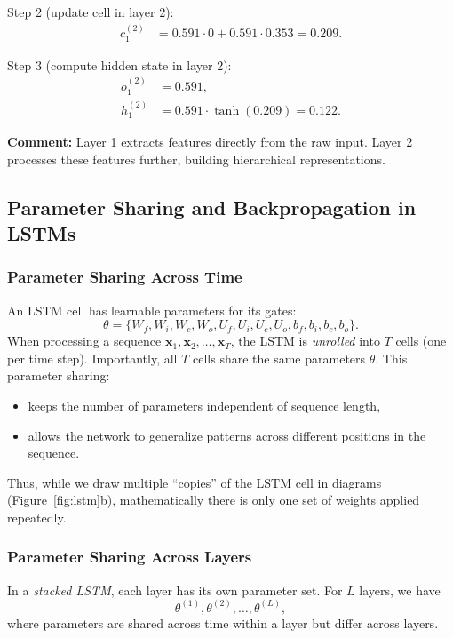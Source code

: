 \documentclass[11pt]{article}
\theoremstyle{remark}
\begin{document}
Step 2 (update cell in layer 2):
\begin{align*}
    c_1^{(2)} &= 0.591 \cdot 0 + 0.591 \cdot 0.353 = 0.209.
\end{align*}

Step 3 (compute hidden state in layer 2):
\begin{align*}
    o_1^{(2)} &= 0.591, \\
    h_1^{(2)} &= 0.591 \cdot \tanh(0.209) = 0.122.
\end{align*}

\noindent \textbf{Comment:} Layer 1 extracts features directly from the raw input. Layer 2 processes these features further, building hierarchical representations.

\subsection{Parameter Sharing and Backpropagation in LSTMs}

\subsubsection*{Parameter Sharing Across Time}
An LSTM cell has learnable parameters for its gates:
\[
\theta = \{ W_f, W_i, W_c, W_o, U_f, U_i, U_c, U_o, b_f, b_i, b_c, b_o \}.
\]
When processing a sequence $\mathbf{x}_1, \mathbf{x}_2, \dots, \mathbf{x}_T$, the LSTM is \textit{unrolled} into $T$ cells (one per time step). Importantly, all $T$ cells share the same parameters $\theta$. This parameter sharing:
\begin{itemize}
    \item keeps the number of parameters independent of sequence length,
    \item allows the network to generalize patterns across different positions in the sequence.
\end{itemize}
Thus, while we draw multiple ``copies'' of the LSTM cell in diagrams (Figure~\ref{fig:lstm}b), mathematically there is only one set of weights applied repeatedly.

\subsubsection*{Parameter Sharing Across Layers}
In a \textit{stacked LSTM}, each layer has its own parameter set. For $L$ layers, we have
\[
\theta^{(1)}, \theta^{(2)}, \dots, \theta^{(L)},
\]
where parameters are shared across time within a layer but differ across layers.
\end{document}
